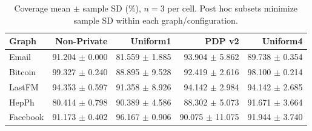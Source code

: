 \begin{table}[htbp]
\centering\small
\caption{Coverage mean $\pm$ sample SD (\%), $n=3$ per cell. Post hoc subsets minimize sample SD within each graph/configuration.}\label{tab:coverage}
\begin{tabular}{lrrrr}
\toprule
Graph & Non-Private & Uniform1 & PDP v2 & Uniform4\\ \midrule
Email & 91.204 $\pm$ 0.000 & 81.559 $\pm$ 1.885 & 93.904 $\pm$ 5.862 & 89.738 $\pm$ 0.354 \\
Bitcoin & 99.327 $\pm$ 0.240 & 88.895 $\pm$ 9.528 & 92.419 $\pm$ 2.616 & 98.100 $\pm$ 0.214 \\
LastFM & 94.353 $\pm$ 0.597 & 91.358 $\pm$ 8.926 & 94.142 $\pm$ 2.984 & 94.142 $\pm$ 2.685 \\
HepPh & 80.414 $\pm$ 0.798 & 90.389 $\pm$ 4.586 & 88.302 $\pm$ 5.073 & 91.671 $\pm$ 3.664 \\
Facebook & 91.173 $\pm$ 0.402 & 96.167 $\pm$ 0.906 & 90.075 $\pm$ 11.075 & 91.944 $\pm$ 3.740 \\
\bottomrule\end{tabular}
\end{table}
